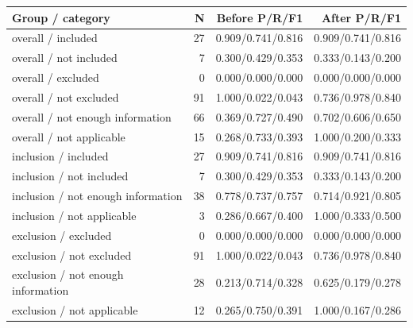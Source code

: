 \begin{tabular}{lrrr}
\toprule
Group / category & N & Before P/R/F1 & After P/R/F1 \\
\midrule
overall / included & 27 & 0.909/0.741/0.816 & 0.909/0.741/0.816 \\
overall / not included & 7 & 0.300/0.429/0.353 & 0.333/0.143/0.200 \\
overall / excluded & 0 & 0.000/0.000/0.000 & 0.000/0.000/0.000 \\
overall / not excluded & 91 & 1.000/0.022/0.043 & 0.736/0.978/0.840 \\
overall / not enough information & 66 & 0.369/0.727/0.490 & 0.702/0.606/0.650 \\
overall / not applicable & 15 & 0.268/0.733/0.393 & 1.000/0.200/0.333 \\
inclusion / included & 27 & 0.909/0.741/0.816 & 0.909/0.741/0.816 \\
inclusion / not included & 7 & 0.300/0.429/0.353 & 0.333/0.143/0.200 \\
inclusion / not enough information & 38 & 0.778/0.737/0.757 & 0.714/0.921/0.805 \\
inclusion / not applicable & 3 & 0.286/0.667/0.400 & 1.000/0.333/0.500 \\
exclusion / excluded & 0 & 0.000/0.000/0.000 & 0.000/0.000/0.000 \\
exclusion / not excluded & 91 & 1.000/0.022/0.043 & 0.736/0.978/0.840 \\
exclusion / not enough information & 28 & 0.213/0.714/0.328 & 0.625/0.179/0.278 \\
exclusion / not applicable & 12 & 0.265/0.750/0.391 & 1.000/0.167/0.286 \\
\bottomrule
\end{tabular}
